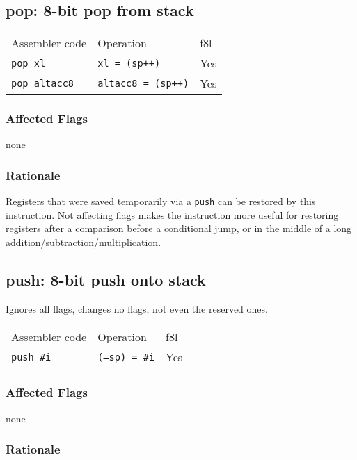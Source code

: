 \documentclass{book}
\begin{document}
\subsection{pop: 8-bit pop from stack}

\begin{tabular}{l l l}
Assembler code       & Operation                 & f8l \\
\texttt{pop xl}      & \texttt{xl = (sp++)}      & Yes \\
\texttt{pop altacc8} & \texttt{altacc8 = (sp++)} & Yes \\
\end{tabular}

\subsubsection*{Affected Flags}

none

\subsubsection*{Rationale}

Registers that were saved temporarily via a \texttt{push} can be restored by this instruction. Not affecting flags makes the instruction more useful for restoring registers after a comparison before a conditional jump, or in the middle of a long addition/subtraction/multiplication.


\subsection{push: 8-bit push onto stack}

Ignores all flags, changes no flags, not even the reserved ones.

\begin{tabular}{l l l}
Assembler code    & Operation             & f8l \\
\texttt{push \#i} & \texttt{(--sp) = \#i} & Yes
\end{tabular}

\subsubsection*{Affected Flags}

none

\subsubsection*{Rationale}
\end{document}
